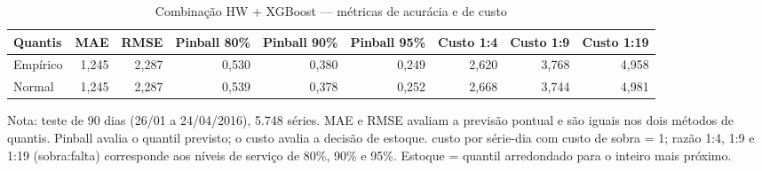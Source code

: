 \begin{table}[htbp]
\centering
\small
\caption{Combinação HW + XGBoost — métricas de acurácia e de custo}
\label{tab:comb_metricas}
\begin{tabular}{lrrrrrrrr}
\toprule
Quantis & MAE & RMSE & Pinball 80\% & Pinball 90\% & Pinball 95\% & Custo 1:4 & Custo 1:9 & Custo 1:19 \\
\midrule
Empírico & 1,245 & 2,287 & 0,530 & 0,380 & 0,249 & 2,620 & 3,768 & 4,958 \\
Normal & 1,245 & 2,287 & 0,539 & 0,378 & 0,252 & 2,668 & 3,744 & 4,981 \\
\bottomrule
\end{tabular}
\par\smallskip
{\footnotesize Nota: teste de 90 dias (26/01 a 24/04/2016), 5.748 séries. MAE e RMSE avaliam a previsão pontual e são iguais nos dois métodos de quantis. Pinball avalia o quantil previsto; o custo avalia a decisão de estoque. custo por série-dia com custo de sobra = 1; razão 1:4, 1:9 e 1:19 (sobra:falta) corresponde aos níveis de serviço de 80\%, 90\% e 95\%. Estoque = quantil arredondado para o inteiro mais próximo.}
\end{table}
